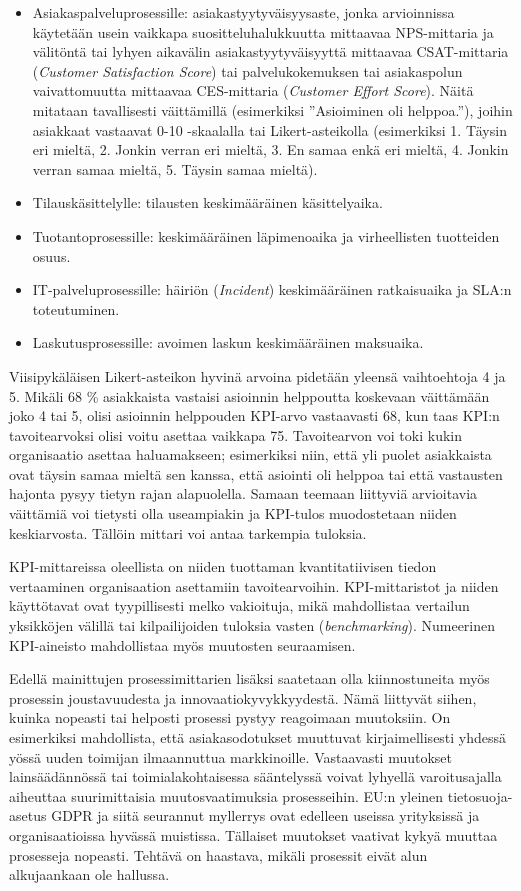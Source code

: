 \documentclass[
  finnish,
  letterpaper,
  DIV=11,
  numbers=noendperiod,
  oneside]{scrreprt}
\providecommand{\tightlist}{%
  \setlength{\itemsep}{0pt}\setlength{\parskip}{0pt}}
\begin{document}
\begin{itemize}
\tightlist
\item
  Asiakaspalveluprosessille: asiakastyytyväisyysaste, jonka arvioinnissa
  käytetään usein vaikkapa suositteluhalukkuutta mittaavaa NPS-mittaria
  ja välitöntä tai lyhyen aikavälin asiakastyytyväisyyttä mittaavaa
  CSAT-mittaria (\emph{Customer Satisfaction Score}) tai
  palvelukokemuksen tai asiakaspolun vaivattomuutta mittaavaa
  CES-mittaria (\emph{Customer Effort Score}). Näitä mitataan
  tavallisesti väittämillä (esimerkiksi ''Asioiminen oli helppoa.''),
  joihin asiakkaat vastaavat 0-10 -skaalalla tai Likert-asteikolla
  (esimerkiksi 1. Täysin eri mieltä, 2. Jonkin verran eri mieltä, 3. En
  samaa enkä eri mieltä, 4. Jonkin verran samaa mieltä, 5. Täysin samaa
  mieltä).
\item
  Tilauskäsittelylle: tilausten keskimääräinen käsittelyaika.
\item
  Tuotantoprosessille: keskimääräinen läpimenoaika ja virheellisten
  tuotteiden osuus.
\item
  IT-palveluprosessille: häiriön (\emph{Incident}) keskimääräinen
  ratkaisuaika ja SLA:n toteutuminen.
\item
  Laskutusprosessille: avoimen laskun keskimääräinen maksuaika.
\end{itemize}

Viisipykäläisen Likert-asteikon hyvinä arvoina pidetään yleensä
vaihtoehtoja 4 ja 5. Mikäli 68 \% asiakkaista vastaisi asioinnin
helppoutta koskevaan väittämään joko 4 tai 5, olisi asioinnin helppouden
KPI-arvo vastaavasti 68, kun taas KPI:n tavoitearvoksi olisi voitu
asettaa vaikkapa 75. Tavoitearvon voi toki kukin organisaatio asettaa
haluamakseen; esimerkiksi niin, että yli puolet asiakkaista ovat täysin
samaa mieltä sen kanssa, että asiointi oli helppoa tai että vastausten
hajonta pysyy tietyn rajan alapuolella. Samaan teemaan liittyviä
arvioitavia väittämiä voi tietysti olla useampiakin ja KPI-tulos
muodostetaan niiden keskiarvosta. Tällöin mittari voi antaa tarkempia
tuloksia.

KPI-mittareissa oleellista on niiden tuottaman kvantitatiivisen tiedon
vertaaminen organisaation asettamiin tavoitearvoihin. KPI-mittaristot ja
niiden käyttötavat ovat tyypillisesti melko vakioituja, mikä
mahdollistaa vertailun yksikköjen välillä tai kilpailijoiden tuloksia
vasten (\emph{benchmarking}). Numeerinen KPI-aineisto mahdollistaa myös
muutosten seuraamisen.

Edellä mainittujen prosessimittarien lisäksi saatetaan olla
kiinnostuneita myös prosessin joustavuudesta ja innovaatiokyvykkyydestä.
Nämä liittyvät siihen, kuinka nopeasti tai helposti prosessi pystyy
reagoimaan muutoksiin. On esimerkiksi mahdollista, että asiakasodotukset
muuttuvat kirjaimellisesti yhdessä yössä uuden toimijan ilmaannuttua
markkinoille. Vastaavasti muutokset lainsäädännössä tai
toimialakohtaisessa sääntelyssä voivat lyhyellä varoitusajalla aiheuttaa
suurimittaisia muutosvaatimuksia prosesseihin. EU:n yleinen
tietosuoja-asetus GDPR ja siitä seurannut myllerrys ovat edelleen
useissa yrityksissä ja organisaatioissa hyvässä muistissa. Tällaiset
muutokset vaativat kykyä muuttaa prosesseja nopeasti. Tehtävä on
haastava, mikäli prosessit eivät alun alkujaankaan ole hallussa.
\end{document}
